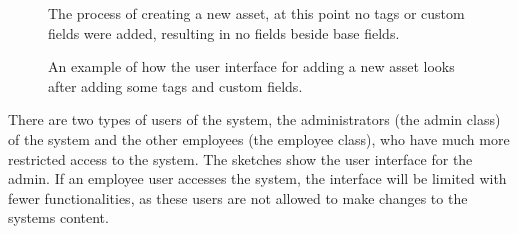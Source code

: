 \begin{figure}[H]
    \centering
    \caption{The process of creating a new asset, at this point no tags or custom fields were added, resulting in no fields beside base fields.}
    \label{fig:add_asset_no_tags}
\end{figure}

\begin{figure}[H]
    \centering
    \caption{An example of how the user interface for adding a new asset looks after adding some tags and custom fields.}
    \label{fig:add_asset_with_tags}
\end{figure}

There are two types of users of the system, the administrators (the admin class) of the system and the other employees (the employee class), who have much more restricted access to the system. The sketches show the user interface for the admin. If an employee user accesses the system, the interface will be limited with fewer functionalities, as these users are not allowed to make changes to the systems content.